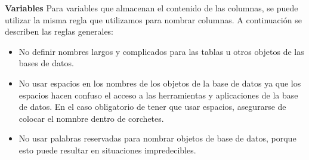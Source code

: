 \textbf{Variables}
Para variables que almacenan el contenido de las columnas, se puede utilizar la misma regla que utilizamos para nombrar columnas. A continuación se describen las reglas generales:

\begin{itemize}
\item No definir nombres largos y complicados para las tablas u otros objetos de las bases de datos.
\item No usar espacios en los nombres de los objetos de la base de datos ya que los espacios hacen confuso el acceso a las herramientas y aplicaciones de 
la base de datos. En el caso obligatorio de tener que usar espacios, asegurarse de colocar el nomnbre dentro de corchetes.
\item No usar palabras reservadas para nombrar objetos de base de datos, porque esto puede resultar en situaciones impredecibles.
\end{itemize}
\cleardoublepage

